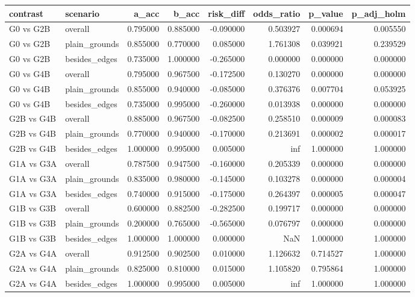 \begin{tabular}{llrrrrrr}
\toprule
contrast & scenario & a_acc & b_acc & risk_diff & odds_ratio & p_value & p_adj_holm \\
\midrule
G0 vs G2B & overall & 0.795000 & 0.885000 & -0.090000 & 0.503927 & 0.000694 & 0.005550 \\
G0 vs G2B & plain_grounds & 0.855000 & 0.770000 & 0.085000 & 1.761308 & 0.039921 & 0.239529 \\
G0 vs G2B & besides_edges & 0.735000 & 1.000000 & -0.265000 & 0.000000 & 0.000000 & 0.000000 \\
G0 vs G4B & overall & 0.795000 & 0.967500 & -0.172500 & 0.130270 & 0.000000 & 0.000000 \\
G0 vs G4B & plain_grounds & 0.855000 & 0.940000 & -0.085000 & 0.376376 & 0.007704 & 0.053925 \\
G0 vs G4B & besides_edges & 0.735000 & 0.995000 & -0.260000 & 0.013938 & 0.000000 & 0.000000 \\
G2B vs G4B & overall & 0.885000 & 0.967500 & -0.082500 & 0.258510 & 0.000009 & 0.000083 \\
G2B vs G4B & plain_grounds & 0.770000 & 0.940000 & -0.170000 & 0.213691 & 0.000002 & 0.000017 \\
G2B vs G4B & besides_edges & 1.000000 & 0.995000 & 0.005000 & inf & 1.000000 & 1.000000 \\
G1A vs G3A & overall & 0.787500 & 0.947500 & -0.160000 & 0.205339 & 0.000000 & 0.000000 \\
G1A vs G3A & plain_grounds & 0.835000 & 0.980000 & -0.145000 & 0.103278 & 0.000000 & 0.000004 \\
G1A vs G3A & besides_edges & 0.740000 & 0.915000 & -0.175000 & 0.264397 & 0.000005 & 0.000047 \\
G1B vs G3B & overall & 0.600000 & 0.882500 & -0.282500 & 0.199717 & 0.000000 & 0.000000 \\
G1B vs G3B & plain_grounds & 0.200000 & 0.765000 & -0.565000 & 0.076797 & 0.000000 & 0.000000 \\
G1B vs G3B & besides_edges & 1.000000 & 1.000000 & 0.000000 & NaN & 1.000000 & 1.000000 \\
G2A vs G4A & overall & 0.912500 & 0.902500 & 0.010000 & 1.126632 & 0.714527 & 1.000000 \\
G2A vs G4A & plain_grounds & 0.825000 & 0.810000 & 0.015000 & 1.105820 & 0.795864 & 1.000000 \\
G2A vs G4A & besides_edges & 1.000000 & 0.995000 & 0.005000 & inf & 1.000000 & 1.000000 \\
\bottomrule
\end{tabular}
